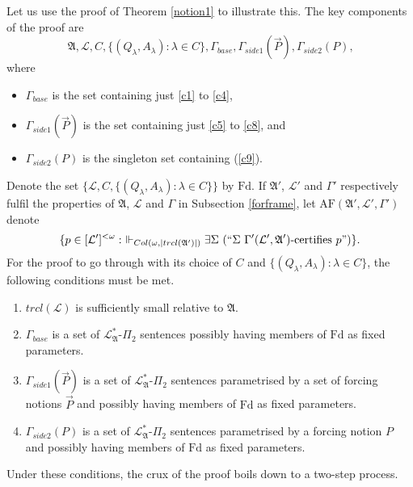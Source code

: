 \documentclass[12pt]{article}
\numberwithin{equation}{section}
\begin{document}
Let us use the proof of Theorem \ref{notion1} to illustrate this. The key components of the proof are 
\begin{equation*}
    \mathfrak{A}, \mathcal{L}, C, \{(Q_{\lambda}, A_{\lambda}) : \lambda \in C\}, \Gamma_{base}, \Gamma_{side1}(\Vec{P}), \Gamma_{side2}(P) \text{,}
\end{equation*}
where 
\begin{itemize}
    \item $\Gamma_{base}$ is the set containing just \ref{c1} to \ref{c4},
    \item $\Gamma_{side1}(\Vec{P})$ is the set containing just \ref{c5} to \ref{c8}, and
    \item $\Gamma_{side2}(P)$ is the singleton set containing (\ref{c9}).
\end{itemize}
Denote the set $\{\mathcal{L}, C, \{(Q_{\lambda}, A_{\lambda}) : \lambda \in C\}\}$ by $\mathrm{Fd}$. If $\mathfrak{A}'$, $\mathcal{L}'$ and $\Gamma'$ respectively fulfil the properties of $\mathfrak{A}$, $\mathcal{L}$ and $\Gamma$ in Subsection \ref{forframe}, let $\mathrm{AF}(\mathfrak{A}', \mathcal{L}', \Gamma')$ denote
\begin{equation*}
    \{p \in [\mathcal{L}']^{< \omega} : \ \Vdash_{Col(\omega, |trcl(\mathfrak{A}')|)} \exists \Sigma \ (``\Sigma \ \Gamma'(\mathcal{L}', \mathfrak{A}') \text{-certifies } p")\} \text{.}
\end{equation*}
For the proof to go through with its choice of $C$ and $\{(Q_{\lambda}, A_{\lambda}) : \lambda \in C\}$, the following conditions must be met.
\begin{enumerate}[label=(\alph*)]
    \item $trcl(\mathcal{L})$ is sufficiently small relative to $\mathfrak{A}$.
    \item $\Gamma_{base}$ is a set of $\mathcal{L}^*_{\mathfrak{A}}$-$\Pi_2$ sentences possibly having members of $\mathrm{Fd}$ as fixed parameters.
    \item $\Gamma_{side1}(\Vec{P})$ is a set of $\mathcal{L}^*_{\mathfrak{A}}$-$\Pi_2$ sentences parametrised by a set of forcing notions $\Vec{P}$ and possibly having members of $\mathrm{Fd}$ as fixed parameters.
    \item $\Gamma_{side2}(P)$ is a set of $\mathcal{L}^*_{\mathfrak{A}}$-$\Pi_2$ sentences parametrised by a forcing notion $P$ and possibly having members of $\mathrm{Fd}$ as fixed parameters.
\end{enumerate}
Under these conditions, the crux of the proof boils down to a two-step process.
\end{document}

